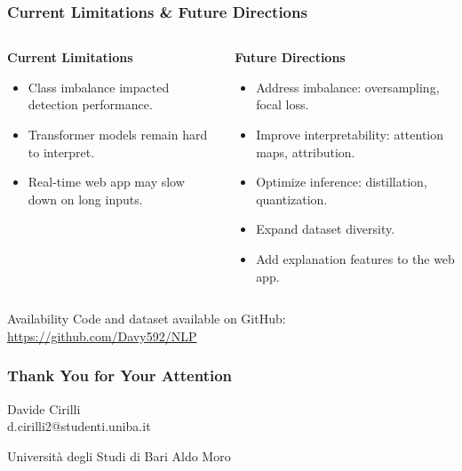 \documentclass{beamer}
\begin{document}
\begin{frame}
\frametitle{Current Limitations \& Future Directions}

\begin{columns}
\begin{column}{0.48\textwidth}
\textbf{Current Limitations}
\begin{itemize}
\item Class imbalance impacted detection performance.
\item Transformer models remain hard to interpret.
\item Real-time web app may slow down on long inputs.
\end{itemize}
\end{column}

\begin{column}{0.48\textwidth}
\textbf{Future Directions}
\begin{itemize}
\item Address imbalance: oversampling, focal loss.
\item Improve interpretability: attention maps, attribution.
\item Optimize inference: distillation, quantization.
\item Expand dataset diversity.
\item Add explanation features to the web app.
\end{itemize}
\end{column}
\end{columns}

\vspace{0.3cm}
\begin{block}{Availability}
Code and dataset available on GitHub: \\
\url{https://github.com/Davy592/NLP}
\end{block}

\end{frame}

\begin{frame}
\frametitle{Thank You for Your Attention}

\begin{center}

\vspace{1cm}
\Large{Davide Cirilli}\\
\normalsize{d.cirilli2@studenti.uniba.it}

\vspace{0.5cm}
\normalsize{Università degli Studi di Bari Aldo Moro}
\end{center}
\end{frame}
\end{document}
